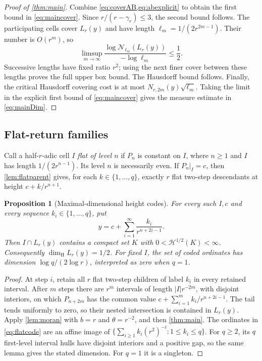 \documentclass[11pt]{article}
\newtheorem{proposition}[theorem]{Proposition}
\theoremstyle{definition}
\theoremstyle{remark}
\newcommand{\dimH}{\dim_{\mathrm H}}
\newcommand{\HH}{\mathcal H}
\begin{document}
\begin{proof}[Proof of \cref{thm:main}]
Combine \cref{eq:coverAB,eq:abexplicit} to obtain the first bound in
\cref{eq:maincover}. Since $r/(r-\gamma_r)\le3$, the second bound follows.
The participating cells cover $L_r(y)$ and have length
$\ell_m=1/(2r^{2m-1})$. Their number is $O(r^m)$, so
\[
 \limsup_{m\to\infty}
 \frac{\log\mathcal N_{\ell_m}(L_r(y))}{-\log\ell_m}\le\frac12.
\]
Successive lengths have fixed ratio $r^2$; using the next finer cover
between these lengths proves the full upper box bound.
The Hausdorff bound follows.
Finally, the critical Hausdorff covering cost is at most
$N_{r,2m}(y)\sqrt{\ell_m}$. Taking the limit in the explicit first
bound of \cref{eq:maincover} gives the measure estimate in
\cref{eq:mainDim}.
\end{proof}

\subsection{Flat-return families}\label{sec:flatfamilies}
Call a half-$r$-adic cell $I$ \emph{flat of level $n$} if $P_n$ is
constant on $I$, where $n\ge1$ and $I$ has length $1/(2r^{n-1})$. Its level $n$ is
necessarily even. If $P_n|_I=c$, then \cref{lem:flatparent} gives, for each
$k\in\{1,\ldots,q\}$, exactly $r$ flat two-step descendants at height
$c+k/r^{n+1}$.

\begin{proposition}[Maximal-dimensional height codes]\label{prop:flatcodes}
For every such $I,c$ and every sequence $k_i\in\{1,\ldots,q\}$, put
\begin{equation}\label{eq:flatcode}
 y=c+\sum_{i=1}^{\infty}\frac{k_i}{r^{n+2i-1}}.
\end{equation}
Then $I\cap L_r(y)$ contains a compact set $K$ with
$0<\HH^{1/2}(K)<\infty$. Consequently $\dimH L_r(y)=1/2$.
For fixed $I$, the set of coded ordinates has dimension
$\log q/(2\log r)$, interpreted as zero when $q=1$.
\end{proposition}
\begin{proof}
At step $i$, retain all $r$ flat two-step children of label $k_i$ in every
retained interval. After $m$ steps there are $r^m$ intervals of length
$|I|r^{-2m}$, with disjoint interiors, on which $P_{n+2m}$ has the common
value
$c+\sum_{i=1}^m k_i/r^{n+2i-1}$.
The tail tends uniformly to zero, so their nested intersection is contained
in $L_r(y)$. Apply \cref{lem:moran} with $b=r$ and $\theta=r^{-2}$, and
then \cref{thm:main}.
The ordinates in \cref{eq:flatcode} are an affine image of
$\{\sum_{i\ge1}k_i(r^2)^{-i}:1\le k_i\le q\}$.
For $q\ge2$, its $q$ first-level interval hulls have disjoint interiors
and a positive gap, so the same lemma gives the stated dimension.
For $q=1$ it is a singleton.
\end{proof}
\end{document}
